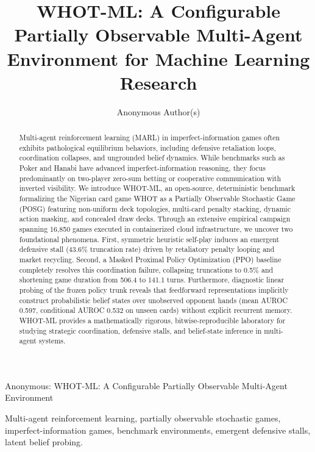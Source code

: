 \documentclass[journal]{IEEEtran}
\begin{document}
\title{WHOT-ML: A Configurable Partially Observable Multi-Agent Environment for Machine Learning Research}

\author{Anonymous Author(s)}

%
{Anonymous: WHOT-ML: A Configurable Partially Observable Multi-Agent Environment}

\maketitle

\begin{abstract}
Multi-agent reinforcement learning (MARL) in imperfect-information games often exhibits pathological equilibrium behaviors, including defensive retaliation loops, coordination collapses, and ungrounded belief dynamics. While benchmarks such as Poker and Hanabi have advanced imperfect-information reasoning, they focus predominantly on two-player zero-sum betting or cooperative communication with inverted visibility. We introduce WHOT-ML, an open-source, deterministic benchmark formalizing the Nigerian card game WHOT as a Partially Observable Stochastic Game (POSG) featuring non-uniform deck topologies, multi-card penalty stacking, dynamic action masking, and concealed draw decks. Through an extensive empirical campaign spanning 16,850 games executed in containerized cloud infrastructure, we uncover two foundational phenomena. First, symmetric heuristic self-play induces an emergent defensive stall (43.6\% truncation rate) driven by retaliatory penalty looping and market recycling. Second, a Masked Proximal Policy Optimization (PPO) baseline completely resolves this coordination failure, collapsing truncations to 0.5\% and shortening game duration from 506.4 to 141.1 turns. Furthermore, diagnostic linear probing of the frozen policy trunk reveals that feedforward representations implicitly construct probabilistic belief states over unobserved opponent hands (mean AUROC 0.597, conditional AUROC 0.532 on unseen cards) without explicit recurrent memory. WHOT-ML provides a mathematically rigorous, bitwise-reproducible laboratory for studying strategic coordination, defensive stalls, and belief-state inference in multi-agent systems.
\end{abstract}

\begin{IEEEkeywords}
Multi-agent reinforcement learning, partially observable stochastic games, imperfect-information games, benchmark environments, emergent defensive stalls, latent belief probing.
\end{IEEEkeywords}
\end{document}
